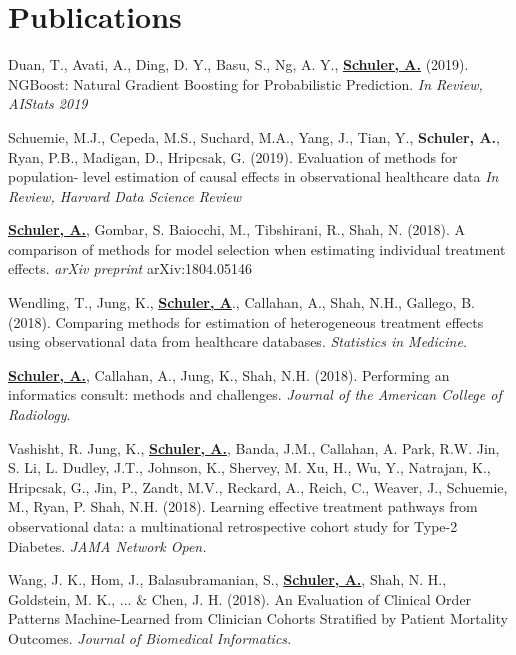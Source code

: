 \section{\mysidestyle Publications}

Duan, T., Avati, A., Ding, D. Y., Basu, S., Ng, A. Y.,
\href{https://stanfordmlgroup.github.io/projects/ngboost/}{\textbf{Schuler, A.}}
(2019). 
NGBoost: Natural Gradient Boosting for Probabilistic Prediction. 
\textsl{In Review, AIStats 2019}

Schuemie, M.J., Cepeda, M.S., Suchard, M.A., Yang, J., Tian, Y., \textbf{Schuler, A.}, Ryan, P.B., Madigan, D., Hripcsak, G.
(2019).
Evaluation of methods for population-
level estimation of causal effects in
observational healthcare data
\textsl{In Review, Harvard Data Science Review}

\href{https://arxiv.org/abs/1804.05146}{\textbf{Schuler, A.}}, Gombar, S. Baiocchi, M., Tibshirani, R., Shah, N.
(2018).
A comparison of methods for model selection when estimating individual treatment effects.
\textsl{arXiv preprint} arXiv:1804.05146

Wendling, T., Jung, K., \href{https://onlinelibrary.wiley.com/doi/abs/10.1002/sim.7820}{\textbf{Schuler, A}}., Callahan, A., Shah, N.H., Gallego, B. 
(2018).
Comparing methods for estimation of heterogeneous treatment effects using observational data from healthcare databases. 
\textsl{Statistics in Medicine.}

\href{http://www.jacr.org/article/S1546-1440(17)31668-X/fulltext}{\textbf{Schuler, A.}}, Callahan, A., Jung, K., Shah, N.H. 
(2018). 
Performing an informatics consult: methods and challenges. 
\textsl{Journal of the American College of Radiology}.
	
Vashisht, R. Jung, K., \href{https://www.ncbi.nlm.nih.gov/pmc/articles/PMC5333256/}{\textbf{Schuler, A.}},
Banda, J.M., Callahan, A. Park, R.W. Jin, S. Li, L. Dudley, J.T., Johnson, K., Shervey, M. Xu, H., Wu, Y., Natrajan, K., Hripcsak, G., Jin, P., Zandt, M.V., Reckard, A., Reich, C., Weaver, J., Schuemie, M., Ryan, P. Shah, N.H.  
(2018).
Learning effective treatment pathways from observational data: a multinational retrospective cohort study for Type-2 Diabetes. 
\textsl{JAMA Network Open.}

Wang, J. K., Hom, J., Balasubramanian, S., 
\href{https://linkinghub.elsevier.com/retrieve/pii/S1532046418301795}{\textbf{Schuler, A.}},
Shah, N. H., Goldstein, M. K., ... \& Chen, J. H. (2018). 
An Evaluation of Clinical Order Patterns Machine-Learned from Clinician Cohorts Stratified by Patient Mortality Outcomes. 
\textsl{Journal of Biomedical Informatics.}


